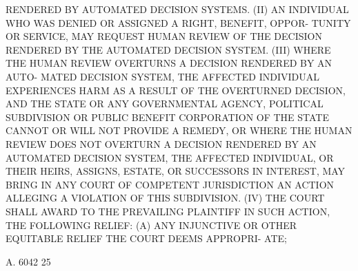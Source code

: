  RENDERED BY AUTOMATED DECISION SYSTEMS.
   (II) AN INDIVIDUAL WHO WAS DENIED OR ASSIGNED A RIGHT, BENEFIT, OPPOR-
 TUNITY  OR SERVICE, MAY REQUEST HUMAN REVIEW OF THE DECISION RENDERED BY
 THE AUTOMATED DECISION SYSTEM.
   (III) WHERE THE HUMAN REVIEW OVERTURNS A DECISION RENDERED BY AN AUTO-
 MATED DECISION SYSTEM, THE AFFECTED INDIVIDUAL  EXPERIENCES  HARM  AS  A
 RESULT  OF  THE  OVERTURNED  DECISION, AND THE STATE OR ANY GOVERNMENTAL
 AGENCY, POLITICAL SUBDIVISION OR PUBLIC BENEFIT CORPORATION OF THE STATE
 CANNOT OR WILL NOT PROVIDE A REMEDY, OR WHERE THE HUMAN REVIEW DOES  NOT
 OVERTURN  A  DECISION  RENDERED  BY  AN  AUTOMATED  DECISION SYSTEM, THE
 AFFECTED INDIVIDUAL, OR THEIR HEIRS, ASSIGNS, ESTATE, OR  SUCCESSORS  IN
 INTEREST,  MAY  BRING  IN  ANY COURT OF COMPETENT JURISDICTION AN ACTION
 ALLEGING A VIOLATION OF THIS SUBDIVISION.
   (IV) THE COURT SHALL AWARD TO THE PREVAILING PLAINTIFF IN SUCH ACTION,
 THE FOLLOWING RELIEF:
   (A) ANY INJUNCTIVE OR OTHER EQUITABLE RELIEF THE COURT DEEMS APPROPRI-
 ATE;

 A. 6042                            25
 

